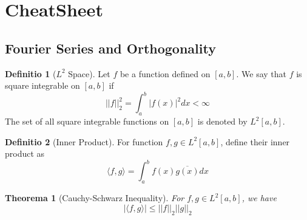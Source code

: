 \documentclass[12pt, a4paper]{article}
\newtheorem{theorem}{Theorema}[subsection]
\theoremstyle{definition}
\newtheorem{definition}{Definitio}[section]
\theoremstyle{remark}
\begin{document}
\section{CheatSheet}
\subsection{Fourier Series and Orthogonality}

\begin{definition}[$L^2$ Space]
	Let $f$ be a function defined on $[a, b]$. We say that $f$ is square integrable on $[a, b]$ if
	\begin{equation}
		||f||^2_2 = \int_{a}^{b} |f(x)|^2 dx < \infty
	\end{equation}
	The set of all square integrable functions on $[a, b]$ is denoted by $L^2[a, b]$.
\end{definition}

\begin{definition}[Inner Product]
	For function $f,g \in L^2[a,b]$, define their inner product as
	\begin{equation}
		\langle f, g \rangle = \int_{a}^{b} f(x)\overline{g(x)} dx
	\end{equation}
\end{definition}

\begin{theorem}[Cauchy-Schwarz Inequality]
	For $f,g \in L^2[a,b]$, we have
	\begin{equation}
		|\langle f, g \rangle| \leq ||f||_2 ||g||_2
	\end{equation}
\end{theorem}
\end{document}
